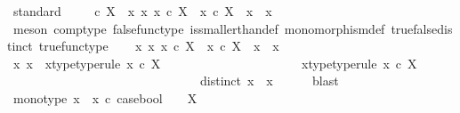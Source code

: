 \begin{isabellebody}
%
\isatagproof
{}\isamarkupfalse%
\ standard\isanewline
\ \ \isamarkupfalse%
\ {\isachardoublequoteopen}{\isasymOmega}\ {\isasymle}\isactrlsub c\ X\ {\isasymLongrightarrow}\ {\isasymexists}x{}\ x{}{\isachardot}{\kern0pt}\ x{}\ {\isasymin}\isactrlsub c\ X\ {\isasymand}\ x{}\ {\isasymin}\isactrlsub c\ X\ {\isasymand}\ x{}\ {\isasymnoteq}\ x{}{\isachardoublequoteclose}\isanewline
\ \ \ \ \isamarkupfalse%
\ {\isacharparenleft}{\kern0pt}meson\ comp{\isacharunderscore}{\kern0pt}type\ false{\isacharunderscore}{\kern0pt}func{\isacharunderscore}{\kern0pt}type\ is{\isacharunderscore}{\kern0pt}smaller{\isacharunderscore}{\kern0pt}than{\isacharunderscore}{\kern0pt}def\ monomorphism{\isacharunderscore}{\kern0pt}def{}\ true{\isacharunderscore}{\kern0pt}false{\isacharunderscore}{\kern0pt}distinct\ true{\isacharunderscore}{\kern0pt}func{\isacharunderscore}{\kern0pt}type{\isacharparenright}{\kern0pt}\isanewline
{}\isamarkupfalse%
\isanewline
\ \ \isamarkupfalse%
\ {\isachardoublequoteopen}{\isasymexists}x{}\ x{}{\isachardot}{\kern0pt}\ x{}\ {\isasymin}\isactrlsub c\ X\ {\isasymand}\ x{}\ {\isasymin}\isactrlsub c\ X\ {\isasymand}\ x{}\ {\isasymnoteq}\ x{}{\isachardoublequoteclose}\isanewline
\ \ \isamarkupfalse%
\ \isamarkupfalse%
\ x{}\ x{}\ \ x{}{\isacharunderscore}{\kern0pt}type{\isacharbrackleft}{\kern0pt}type{\isacharunderscore}{\kern0pt}rule{\isacharbrackright}{\kern0pt}{\isacharcolon}{\kern0pt}\ {\isachardoublequoteopen}x{}\ {\isasymin}\isactrlsub c\ X{\isachardoublequoteclose}\ \isanewline
\ \ \ \ \ \ \ \ \ \ \ \ \ \ \ \ \ \ \ \ \ x{}{\isacharunderscore}{\kern0pt}type{\isacharbrackleft}{\kern0pt}type{\isacharunderscore}{\kern0pt}rule{\isacharbrackright}{\kern0pt}{\isacharcolon}{\kern0pt}\ {\isachardoublequoteopen}x{}\ {\isasymin}\isactrlsub c\ X{\isachardoublequoteclose}\ \isanewline
\ \ \ \ \ \ \ \ \ \ \ \ \ \ \ \ \ \ \ \ \ \ \ \ \ \ \ \ \ \ \ distinct{\isacharcolon}{\kern0pt}\ {\isachardoublequoteopen}x{}\ {\isasymnoteq}\ x{}{\isachardoublequoteclose}\isanewline
\ \ \ \ \isamarkupfalse%
\ blast\ \ \isanewline
\ \ \isamarkupfalse%
\ mono{\isacharunderscore}{\kern0pt}type{\isacharcolon}{\kern0pt}\ {\isachardoublequoteopen}{\isacharparenleft}{\kern0pt}{\isacharparenleft}{\kern0pt}x{}\ {\isasymamalg}\ x{}{\isacharparenright}{\kern0pt}\ {\isasymcirc}\isactrlsub c\ case{\isacharunderscore}{\kern0pt}bool{\isacharparenright}{\kern0pt}\ {\isacharcolon}{\kern0pt}\ {\isasymOmega}\ {\isasymrightarrow}\ X{\isachardoublequoteclose}\isanewline

\end{isabellebody}
